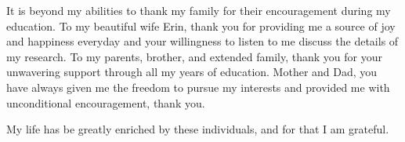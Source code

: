 It is beyond my abilities to thank my family for their encouragement during my
education. To my beautiful wife Erin, thank you for providing me a source of joy
and happiness everyday and your willingness to listen to me discuss the details
of my research. To my parents, brother, and extended family, thank you for your
unwavering support through all my years of education. Mother and Dad, you have
always given me the freedom to pursue my interests and provided me with
unconditional encouragement, thank you.

My life has be greatly enriched by these individuals, and for that I am
grateful.


